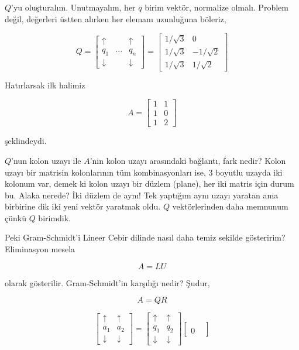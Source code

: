 \documentclass[12pt,fleqn]{article}\usepackage{../../common}
\begin{document}
$Q$'yu oluşturalım. Unutmayalım, her $q$ birim vektör, normalize
olmalı. Problem değil, değerleri üstten alırken her elemanı uzunluğuna
böleriz, 

$$Q =
\left[\begin{array}{rrr}
\uparrow &  & \uparrow \\
q_1 & ... &  q_n \\
\downarrow &  & \downarrow 
\end{array}\right]
=
\left[\begin{array}{rr}
1/\sqrt{3} & 0 \\
1/\sqrt{3} & -1/\sqrt{2} \\
1/\sqrt{3} & 1/\sqrt{2} 
\end{array}\right]
$$

Hatırlarsak ilk halimiz

$$A =
\left[\begin{array}{rr}
1 & 1 \\
1 & 0\\
1 & 2
\end{array}\right]
$$

şeklindeydi. 

$Q$'nun kolon uzayı ile $A$'nin kolon uzayı arasındaki bağlantı, fark
nedir? Kolon uzayı bir matrisin kolonlarının tüm kombinasyonları ise, 3
boyutlu uzayda iki kolonum var, demek ki kolon uzayı bir düzlem (plane),
her iki matris için durum bu. Alaka nerede? İki düzlem de aynı! Tek
yaptığım aynı uzayı yaratan ama birbirine dik iki yeni vektör yaratmak
oldu. $Q$ vektörlerinden daha memnunum çünkü $Q$ birimdik. 

Peki Gram-Schmidt'i Lineer Cebir dilinde nasıl daha temiz sekilde
gösteririm? Eliminasyon mesela 

$$A = LU$$

olarak gösterilir. Gram-Schmidt'in karşılığı nedir? Şudur,

$$A = QR$$


$$
\left[\begin{array}{rrr}
\uparrow &  \uparrow \\
a_1 &  a_2 \\
\downarrow &  \downarrow 
\end{array}\right]
=
\left[\begin{array}{rrr}
\uparrow &  \uparrow \\
q_1 &  q_2 \\
\downarrow &  \downarrow 
\end{array}\right]
\left[\begin{array}{rrr}
 &   \\
0 &  
\end{array}\right]
$$
\end{document}
